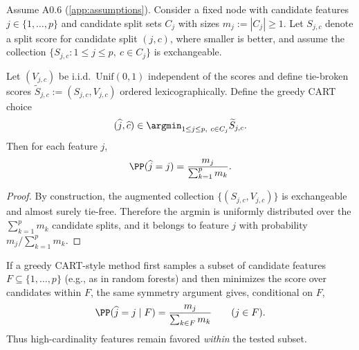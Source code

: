 \begin{lemma}
\label{lem:cart-proportional-selection}
Assume A0.6 (\cref{app:assumptions}). Consider a fixed node with candidate
features $j \in \{1,\dots,p\}$ and candidate split sets $C_j$ with sizes
$m_j := |C_j| \ge 1$. Let $S_{j,c}$ denote a split score for candidate split
$(j,c)$, where smaller is better, and assume the collection
$\{S_{j,c} : 1 \le j \le p,\ c \in C_j\}$ is exchangeable.

Let $(V_{j,c})$ be i.i.d.\ $\mathrm{Unif}(0,1)$ independent of the scores and
define tie-broken scores $\widetilde S_{j,c} := (S_{j,c}, V_{j,c})$ ordered
lexicographically. Define the greedy CART choice
%
\begin{equation}
  (\widehat j, \widehat c) \in \argmin_{1 \le j \le p,\ c \in C_j} \widetilde S_{j,c}.
\end{equation}
%
Then for each feature $j$,
%
\begin{equation}
  \PP(\widehat j = j) = \frac{m_j}{\sum_{k=1}^p m_k}.
\end{equation}
\end{lemma}

\begin{proof}
By construction, the augmented collection $\{(S_{j,c},V_{j,c})\}$ is
exchangeable and almost surely tie-free. Therefore the argmin is uniformly
distributed over the $\sum_{k=1}^p m_k$ candidate splits, and it belongs to
feature $j$ with probability $m_j/\sum_{k=1}^p m_k$.
\end{proof}

\begin{remark}
If a greedy CART-style method first samples a subset of candidate features
$F \subseteq \{1,\dots,p\}$ (e.g., as in random forests) and then minimizes the
score over candidates within $F$, the same symmetry argument gives, conditional
on $F$,
%
\begin{equation}
  \PP(\widehat j = j \mid F) = \frac{m_j}{\sum_{k \in F} m_k} \qquad (j \in F).
\end{equation}
%
Thus high-cardinality features remain favored \emph{within} the tested subset.
\end{remark}
